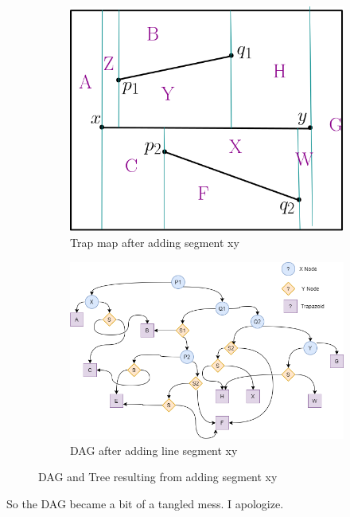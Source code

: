\documentclass[11pt]{article}
\begin{document}
\begin{figure}[h]
    \centering
    \begin{subfigure}{0.3 \textwidth}
        \includegraphics[width = \textwidth]{traps}
        \caption{Trap map after adding segment xy}
    \end{subfigure}
    \begin{subfigure}{0.65 \textwidth}
        \includegraphics[width = \textwidth]{Tree}
        \caption{DAG after adding line segment xy}
    \end{subfigure}
    \caption{DAG and Tree resulting from adding segment xy}
\end{figure}


So the DAG became a bit of a tangled mess. I apologize. 
\end{document}
